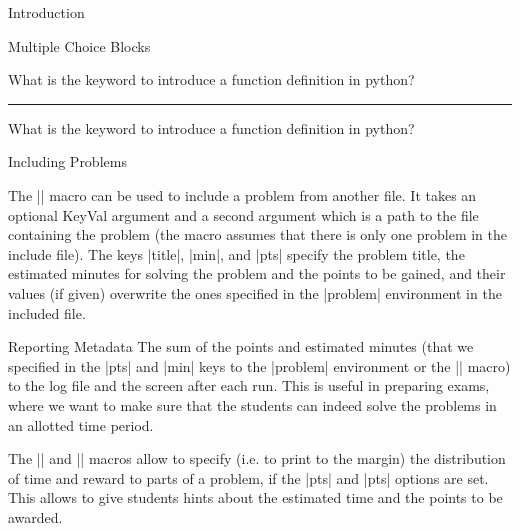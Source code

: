 \begin{sfragment}[id=sec:intro]{Introduction}
\begin{sfragment}[id=sec:user:mcq]{Multiple Choice Blocks}
\begin{sproblem}[title=Functions,name=functions2]
  What is the keyword to introduce a function definition in python?
  \begin{mcb}
  \end{mcb}
\end{sproblem}
\solutionstrue\hrule
\begin{sproblem}[title=Functions,name=functions3]
  What is the keyword to introduce a function definition in python?
  \begin{mcb}
  \end{mcb}
\end{sproblem}
\end{sfragment}

\begin{sfragment}[id=sec:user:includeproblem]{Including Problems}
  
\begin{function}{}
  The || macro can be used to include a problem from another file. It takes
  an optional KeyVal argument and a second argument which is a path to the file containing
  the problem (the macro assumes that there is only one problem in the include file). The
  keys |title|, |min|, and |pts| specify the problem title, the estimated minutes for
  solving the problem and the points to be gained, and their values (if given) overwrite
  the ones specified in the |problem| environment in the included file.
\end{function}
\end{sfragment}

\begin{sfragment}[id=sec:user:reporting]{Reporting Metadata}
The sum of the points and estimated minutes (that we specified in the |pts| and |min|
keys to the |problem| environment or the || macro) to the log file and
the screen after each run. This is useful in preparing exams, where we want to make sure
that the students can indeed solve the problems in an allotted time period.

The |\min| and |\pts| macros allow to specify (i.e. to print to the margin) the
distribution of time and reward to parts of a problem, if the |pts| and |pts| options are
set. This allows to give students hints about the estimated time and the points to be
awarded.
\end{sfragment}


\end{sfragment}
